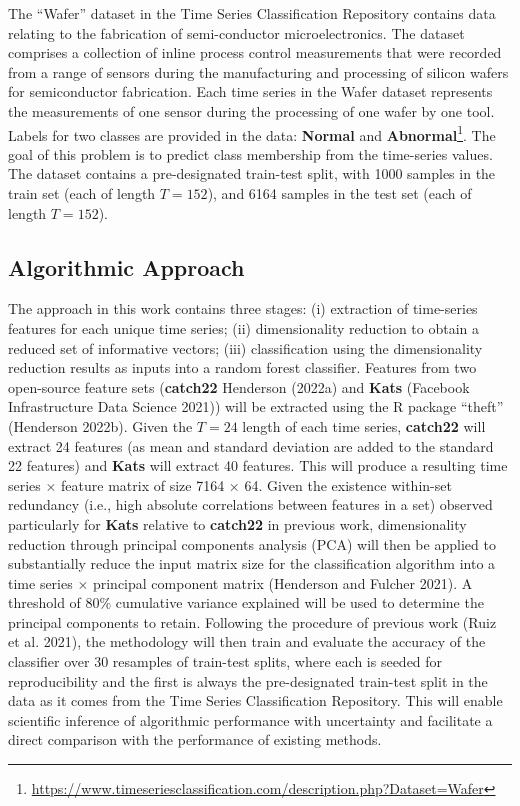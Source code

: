 \documentclass{article}
\begin{document}
The ``Wafer'' dataset in the Time Series Classification Repository
contains data relating to the fabrication of semi-conductor
microelectronics. The dataset comprises a collection of inline process
control measurements that were recorded from a range of sensors during
the manufacturing and processing of silicon wafers for semiconductor
fabrication. Each time series in the Wafer dataset represents the
measurements of one sensor during the processing of one wafer by one
tool. Labels for two classes are provided in the data: \textbf{Normal}
and \textbf{Abnormal}\footnote{\url{https://www.timeseriesclassification.com/description.php?Dataset=Wafer}}.
The goal of this problem is to predict class membership from the
time-series values. The dataset contains a pre-designated train-test
split, with 1000 samples in the train set (each of length \(T = 152\)),
and 6164 samples in the test set (each of length \(T = 152\)).

\hypertarget{algorithmic-approach}{%
\subsection{Algorithmic Approach}\label{algorithmic-approach}}

The approach in this work contains three stages: (i) extraction of
time-series features for each unique time series; (ii) dimensionality
reduction to obtain a reduced set of informative vectors; (iii)
classification using the dimensionality reduction results as inputs into
a random forest classifier. Features from two open-source feature sets
(\textbf{catch22} Henderson (2022a) and \textbf{Kats} (Facebook
Infrastructure Data Science 2021)) will be extracted using the R package
``theft'' (Henderson 2022b). Given the \(T = 24\) length of each time
series, \textbf{catch22} will extract 24 features (as mean and standard
deviation are added to the standard 22 features) and \textbf{Kats} will
extract 40 features. This will produce a resulting time series
\(\times\) feature matrix of size 7164 \(\times\) 64. Given the
existence within-set redundancy (i.e., high absolute correlations
between features in a set) observed particularly for \textbf{Kats}
relative to \textbf{catch22} in previous work, dimensionality reduction
through principal components analysis (PCA) will then be applied to
substantially reduce the input matrix size for the classification
algorithm into a time series \(\times\) principal component matrix
(Henderson and Fulcher 2021). A threshold of 80\(\%\) cumulative
variance explained will be used to determine the principal components to
retain. Following the procedure of previous work (Ruiz et al. 2021), the
methodology will then train and evaluate the accuracy of the classifier
over 30 resamples of train-test splits, where each is seeded for
reproducibility and the first is always the pre-designated train-test
split in the data as it comes from the Time Series Classification
Repository. This will enable scientific inference of algorithmic
performance with uncertainty and facilitate a direct comparison with the
performance of existing methods.
\end{document}
